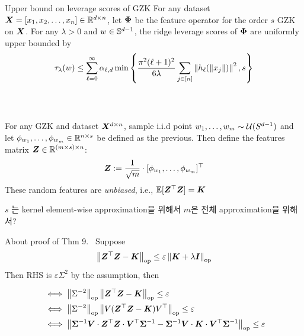 \documentclass[9pt,t,aspectratio=169]{beamer}
\begin{document}
\begin{frame}{Upper bound on leverage scores of GZK}
 For any dataset ${\bm{X}} = [x_1, x_2, \dots, x_n] \in \mathbb{R}^{d \times n}$, let ${\bm{\Phi}}$ be the feature operator for the order $s$ GZK on ${\bm{X}}$. For any $\lambda >0$ and $w \in \mathbb{S}^{d-1}$, the ridge leverage scores of ${\bm{\Phi}}$ are uniformly upper bounded by 
\begin{equation*}
    \tau_{\lambda} (w) \leq \sum_{\ell=0}^{\infty} \alpha_{\ell, d} \min \left\{  \frac{\pi^2 ( \ell+1)^2}{6 \lambda} \sum_{j \in [n]} \left\lVert h_{\ell} ( \left\lVert x_j\right\rVert)\right\rVert^2, s \right\}
\end{equation*}
\\~\\ 
\begin{define}
For any GZK and dataset ${\bm{X}}^{d \times n}$, sample i.i.d point $w_1, \dots, w_m \sim \mathcal{U}(S^{d-1})$ and let $\phi_{w_1}, \dots, \phi_{w_m} \in \mathbb{R}^{n \times s}$ be defined as the previous. Then define the  features matrix ${\bm{Z}} \in \mathbb{R}^{ (m \times s) \times n}$: 
\begin{equation*}
    {\bm{Z}} := \frac{1}{\sqrt{m}} \cdot [\phi_{w_1}, \dots, \phi_{w_m}]^{\top}
\end{equation*}
These random features are \emph{unbiased}, i.e., $\mathop{\mathbb{E} \displaystyle}[ {\bm{Z}}^{\top} {\bm{Z}}] = {\bm{K}}$
\end{define}
$s$ 는 kernel element-wise approximation을 위해서 $m$은 전체 approximation을 위해서? 
\end{frame}
\begin{frame}{About proof of Thm 9.}
\
Suppose 
\begin{equation*}
    \left\lVert{\bm{Z}}^{\top}{\bm{Z}} - {\bm{K}}\right\rVert_{\text{op}} \leq \varepsilon\left\lVert{\bm{K}} + \lambda {\bm{I}}\right\rVert_{\text{op}}
\end{equation*}
Then RHS is $\varepsilon \Sigma^2$ by the assumption, then 

\begin{align}
    & \iff \left\lVert\Sigma^{-2}\right\rVert_{\text{op}} \left\lVert{\bm{Z}}^{\top}{\bm{Z}} - {\bm{K}}\right\rVert_{\text{op}} \leq \varepsilon  \\ 
    & \iff \left\lVert\Sigma^{-2}\right\rVert_{\text{op}} \left\lVert V ( {\bm{Z}}^{\top} {\bm{Z}} - {\bm{K}}) V^{\top}\right\rVert_{\text{op}} \leq \varepsilon \\
    & \iff \left\lVert{\bm{\Sigma}}^{-1} {\bm{V}} \cdot {\bm{Z}}^{\top} {\bm{Z}} \cdot {\bm{V}}^{\top} {\bm{\Sigma}}^{-1} - {\bm{\Sigma}}^{-1} {\bm{V}} \cdot {\bm{K}} \cdot {\bm{V}}^{\top} {\bm{\Sigma}}^{-1}\right\rVert_{\text{op}} \leq \varepsilon
\end{align}
\end{frame}
\end{document}
